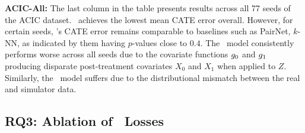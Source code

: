 \textbf{ACIC-All:} The last column in the table presents results across all 77 seeds of the ACIC dataset. \our\ achieves the lowest mean CATE error overall. However, for certain seeds, \our's CATE error remains comparable to baselines such as PairNet, $k$-NN, as indicated by them having $p$-values close to $0.4$. The \realonly\ model consistently performs worse across all seeds due to the covariate functions $g_0$ and $g_1$ producing disparate post-treatment covariates $X_0$ and $X_1$ when applied to $Z$. Similarly, the \simonly\ model suffers due to the distributional mismatch between the real and simulator data.



\subsection{RQ3: Ablation of \our\ Losses}
\label{sec:ablating_losses}
